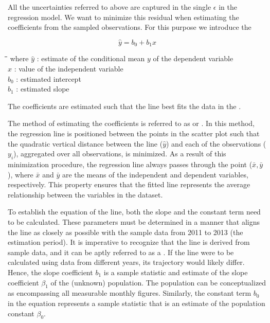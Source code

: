 All the uncertainties referred to above are captured in the single  $\epsilon$ in the regression model. 
We want to minimize this residual when estimating the coefficients from the sampled observations. For this purpose we introduce the 

\begin{equation}
\hat{y} = b_0 + b_1 x
\label{eq:regression_line}
\end{equation}

\noindent
\begin{tabbing}
\hspace*{1.2cm}\=\hspace*{0.4cm}\=\hspace*{0.2cm}\= \kill
where \> $\hat{y}$ \> : \> estimate of the conditional mean $y$ of the dependent variable \\
      \> $x$     \> : \> value of the independent variable \\
      \> $b_0$     \> : \> estimated intercept \\
      \> $b_1$     \> : \> estimated slope
\end{tabbing}

The coefficients are estimated such that the line best fits the data in the . 

The method of estimating the coefficients is referred to as  or . 
In this method, the regression line is positioned between the points in the scatter plot such that the quadratic vertical distance between the line ($\hat{y}$) and each of the observations ($y_i$), aggregated over all observations, is minimized. 
As a result of this minimization procedure, the regression line always passes through the point ($\bar{x}, \bar{y}$), where $\bar{x}$ and $\bar{y}$ are the means of the independent and dependent variables, respectively. 
This property ensures that the fitted line represents the average relationship between the variables in the dataset.

To establish the equation of the line, both the slope and the constant term need to be calculated. 
These parameters must be determined in a manner that aligns the line as closely as possible with the sample data from 2011 to 2013 (the estimation period). It is imperative to recognize that the line is derived from sample data, and it can be aptly referred to as a . 
If the line were to be calculated using data from different years, its trajectory would likely differ. 
Hence, the slope coefficient $b_1$ is a sample statistic and estimate of the slope coefficient $\beta_1$ of the (unknown) population. 
The population can be conceptualized as encompassing all measurable monthly figures. 
Similarly, the constant term $b_0$ in the equation represents a sample statistic that is an estimate of the population constant $\beta_0$. 

